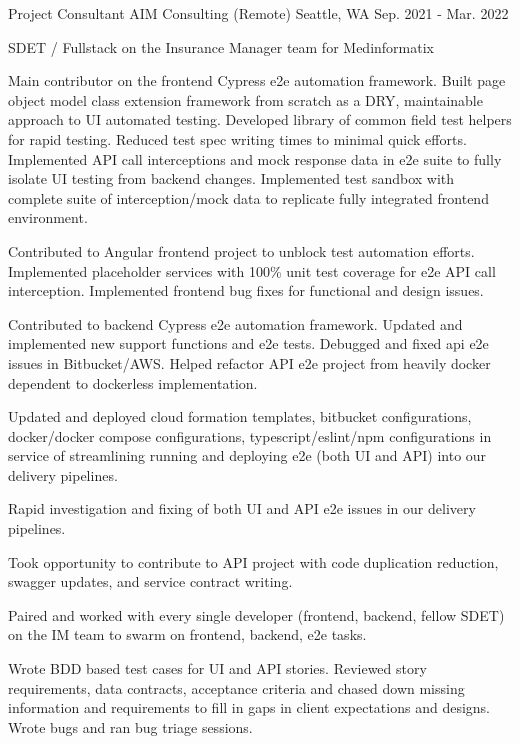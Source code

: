 \begin{cventries}
\cventry
{Project Consultant} %
{AIM Consulting (Remote)} %
{Seattle, WA} %
{Sep. 2021 - Mar. 2022} %
{
\begin{cvitems}
\item[] {SDET / Fullstack on the Insurance Manager team for Medinformatix}
\item[]
\item {Main contributor on the frontend Cypress e2e automation framework. Built page object model class extension framework from scratch as a DRY, maintainable approach to UI automated testing. Developed library of common field test helpers for rapid testing. Reduced test spec writing times to minimal quick efforts. Implemented API call interceptions and mock response data in e2e suite to fully isolate UI testing from backend changes. Implemented test sandbox with complete suite of interception/mock data to replicate fully integrated frontend environment.}
\item {Contributed to Angular frontend project to unblock test automation efforts. Implemented placeholder services with 100\% unit test coverage for e2e API call interception. Implemented frontend bug fixes for functional and design issues.}
\item {Contributed to backend Cypress e2e automation framework. Updated and implemented new support functions and e2e tests. Debugged and fixed api e2e issues in Bitbucket/AWS. Helped refactor API e2e project from heavily docker dependent to dockerless implementation.}
\item {Updated and deployed cloud formation templates, bitbucket configurations, docker/docker compose configurations, typescript/eslint/npm configurations in service of streamlining running and deploying e2e (both UI and API) into our delivery pipelines.}
\item {Rapid investigation and fixing of both UI and API e2e issues in our delivery pipelines.}
\item {Took opportunity to contribute to API project with code duplication reduction, swagger updates, and service contract writing.}
\item {Paired and worked with every single developer (frontend, backend, fellow SDET) on the IM team to swarm on frontend, backend, e2e tasks.}
\item {Wrote BDD based test cases for UI and API stories. Reviewed story requirements, data contracts, acceptance criteria and chased down missing information and requirements to fill in gaps in client expectations and designs. Wrote bugs and ran bug triage sessions.}
\end{cvitems}
}


\end{cventries}
